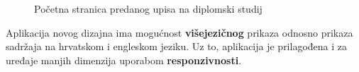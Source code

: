 \documentclass[times, utf8, zavrsni, numeric]{fer}
\begin{document}
    \begin{figure} [H]
      \centering
      \caption{Početna stranica predanog upisa na diplomski studij}
    \end{figure}
    
    Aplikacija novog dizajna ima mogućnost \textbf{višejezičnog} prikaza odnosno prikaza sadržaja na hrvatskom i engleskom jeziku. Uz to, aplikacija je prilagođena i za uređaje manjih dimenzija uporabom \textbf{responzivnosti}. 
    
\end{document}
